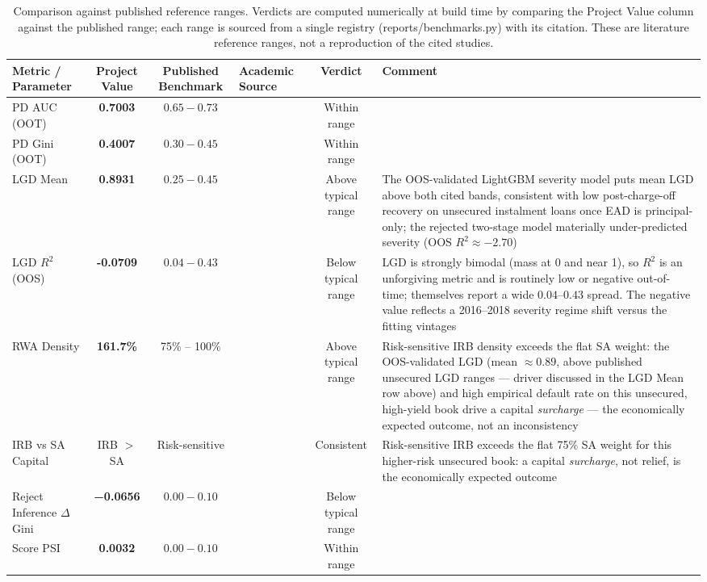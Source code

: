 \documentclass[11pt,a4paper]{article}
\begin{document}
\begin{table}[H]
\centering
\footnotesize
\setlength{\tabcolsep}{2.5pt}
\caption{Comparison against published reference ranges. Verdicts are computed numerically at build time by comparing the Project Value column against the published range; each range is sourced from a single registry (reports/benchmarks.py) with its citation. These are literature reference ranges, not a reproduction of the cited studies.}
\label{tab:benchmark_verification}
\vspace{0.5em}
\begin{tabularx}{\linewidth}{p{2.2cm}ccp{2.2cm}cp{4.5cm}}
\toprule
\textbf{Metric / Parameter} & \textbf{Project Value} & \textbf{Published Benchmark} & \textbf{Academic Source} & \textbf{Verdict} & \textbf{Comment} \\
\midrule
PD AUC (OOT) & \textbf{\num{0.7003}} & $0.65 - 0.73$ & \textcite{lessmann2015benchmarking} & Within range &  \\
PD Gini (OOT) & \textbf{\num{0.4007}} & $0.30 - 0.45$ & \textcite{lessmann2015benchmarking} & Within range & \\
LGD Mean & \textbf{\num{0.8931}} & $0.25 - 0.45$ & \textcite{bellotti2012} & Above typical range & The OOS-validated LightGBM severity model puts mean LGD above both cited bands, consistent with low post-charge-off recovery on unsecured instalment loans once EAD is principal-only; the rejected two-stage model materially under-predicted severity (OOS $R^2 \approx -2.70$) \\
LGD $R^2$ (OOS) & \textbf{-0.0709} & $0.04 - 0.43$ & \textcite{loterman2012benchmarking} & Below typical range & LGD is strongly bimodal (mass at 0 and near 1), so $R^2$ is an unforgiving metric and is routinely low or negative out-of-time; \textcite{loterman2012benchmarking} themselves report a wide $0.04$--$0.43$ spread. The negative value reflects a 2016--2018 severity regime shift versus the fitting vintages \\
RWA Density & \textbf{161.7\%} & 75\% -- 100\% & \textcite{bcbs2017} & Above typical range & Risk-sensitive IRB density exceeds the flat SA weight: the OOS-validated LGD (mean $\approx 0.89$, above published unsecured LGD ranges --- driver discussed in the LGD Mean row above) and high empirical default rate on this unsecured, high-yield book drive a capital \emph{surcharge} --- the economically expected outcome, not an inconsistency \\
IRB vs SA Capital & IRB $>$ SA & Risk-sensitive & \textcite{bcbs2004} & Consistent & Risk-sensitive IRB exceeds the flat 75\% SA weight for this higher-risk unsecured book: a capital \emph{surcharge}, not relief, is the economically expected outcome \\
Reject Inference $\Delta$Gini & \textbf{\num{-0.0656}} & $0.00 - 0.10$ & \textcite{crook2004reject} & Below typical range & \\
Score PSI & \textbf{\num{0.0032}} & $0.00 - 0.10$ & \textcite{siddiqi2017} & Within range & \\
\bottomrule
\end{tabularx}
\end{table}
\end{document}
